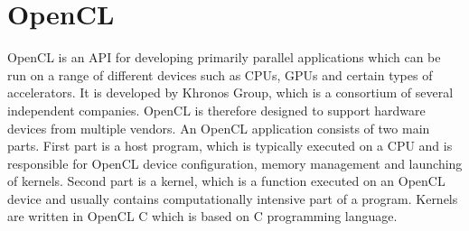 \documentclass
[
    digital, %
    oneside, %
    table, %
    nolof, %
    nolot, %
    nocover %
]{fithesis3}
\begin{document}
\section{OpenCL}
OpenCL is an API for developing primarily parallel applications which can be run on a range of different devices such as CPUs, GPUs and certain types of
accelerators. It is developed by Khronos Group, which is a consortium of several independent companies. OpenCL is therefore designed to support
hardware devices from multiple vendors. An OpenCL application consists of two main parts. First part is a host program, which is typically executed on
a CPU and is responsible for OpenCL device configuration, memory management and launching of kernels. Second part is a kernel, which is a function
executed on an OpenCL device and usually contains computationally intensive part of a program. Kernels are written in OpenCL C which is based on C
programming language.
\end{document}
